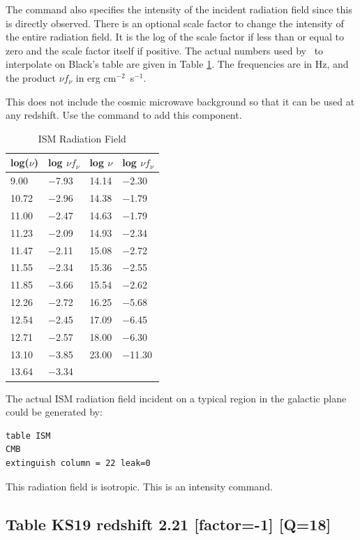 The  command also specifies the intensity
of the incident radiation field since this is directly observed.
There is an optional scale
factor to change the intensity of the entire radiation field.
It is the
log of the scale factor if less than or equal to zero and the scale factor
itself if positive.
The actual numbers used by \Cloudy\ to interpolate on
Black's table are given in Table \ref{tab:ISM_Black}.
The frequencies are in Hz, and the
product $\nu f_\nu$ in erg cm$^{-2}$~s$^{-1}$.

This does not include the cosmic microwave background so that it can be used at any redshift.
Use the 
command to add this component.

\begin{table}
\centering
\caption{ISM Radiation Field}
\label{tab:ISM_Black}\begin{tabular}{llll}\hline
log($\nu$)& log $\nu f_\nu$& log $\nu$& log $\nu f_{\nu}$\\
\hline
9.00& $-$7.93& 14.14& $-$2.30\\
10.72& $-$2.96& 14.38& $-$1.79\\
11.00& $-$2.47& 14.63& $-$1.79\\
11.23& $-$2.09& 14.93& $-$2.34\\
11.47& $-$2.11& 15.08& $-$2.72\\
11.55& $-$2.34& 15.36& $-$2.55\\
11.85& $-$3.66& 15.54& $-$2.62\\
12.26& $-$2.72& 16.25& $-$5.68\\
12.54& $-$2.45& 17.09& $-$6.45\\
12.71& $-$2.57& 18.00& $-$6.30\\
13.10& $-$3.85& 23.00& $-$11.30\\
13.64& $-$3.34\\
\hline
\end{tabular}
\end{table}
The actual ISM radiation field incident on a typical region in the galactic plane could be generated by:
\begin{verbatim}
table ISM
CMB
extinguish column = 22 leak=0
\end{verbatim}

This radiation field is isotropic.
This is an intensity command.

\subsection{Table KS19 redshift 2.21 [factor=-1] [Q=18]}

